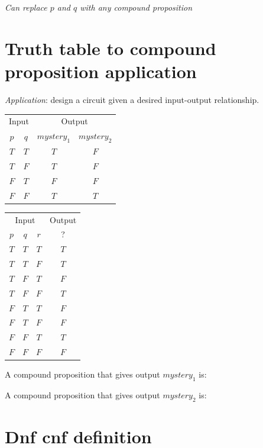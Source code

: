 \documentclass[12pt, oneside]{article}
\begin{document}
{\it Can replace $p$ and $q$ with any compound proposition}

\vfill \vfill
\section*{Truth table to compound proposition application}


{\it Application}: design a circuit given a desired input-output relationship.

\begin{center}
\begin{tabular}{cc||cc}
\multicolumn{2}{c||}{Input}  &\multicolumn{2}{c}{Output}\\
$p$ & $q$& $mystery_1$ & $mystery_2$\\
\hline
$T$ & $T$  & $T$ & $F$\\
$T$ & $F$  & $T$ & $F$\\
$F$ & $T$  & $F$ & $F$\\
$F$ & $F$  & $T$ & $T$\\
\end{tabular}
\qquad \qquad
\begin{tabular}{ccc||c}
\multicolumn{3}{c||}{Input}  & Output\\
$p$ & $q$ & $r$  &  ?\\
\hline
$T$ & $T$  & $T$ & $T$ \\
$T$ & $T$  & $F$ & $T$ \\
$T$ & $F$  & $T$ & $F$ \\
$T$ & $F$  & $F$ & $T$ \\
$F$ & $T$  & $T$ & $F$ \\
$F$ & $T$  & $F$ & $F$ \\
$F$ & $F$  & $T$ & $T$ \\
$F$ & $F$  & $F$ & $F$ \\
\end{tabular}

\end{center}


A compound proposition that  gives output $mystery_1$ is: \underline{\phantom{\hspace{3in}}}


\vfill


A compound proposition that  gives output $mystery_2$ is: \underline{\phantom{\hspace{3in}}}


\vfill \vfill
\section*{Dnf cnf definition}
\end{document}

